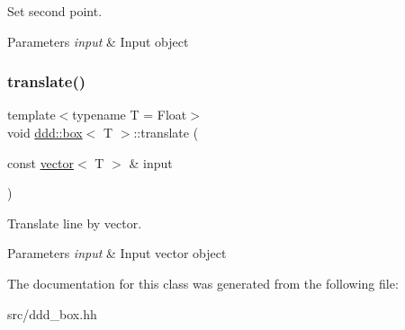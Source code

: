 Set second point. 


\begin{DoxyParams}{Parameters}
{\em input} & Input object \\
\hline
\end{DoxyParams}
\mbox{\label{classddd_1_1box_a6069e4c7bfa545871ff229b4b7e7257f}} 
\subsubsection{\texorpdfstring{translate()}{translate()}}
{\footnotesize\ttfamily template$<$typename T = Float$>$ \\
void \hyperlink{classddd_1_1box}{ddd\+::box}$<$ T $>$\+::translate (\begin{DoxyParamCaption}\item[{const \hyperlink{classddd_1_1vector}{vector}$<$ T $>$ \&}]{input }\end{DoxyParamCaption})\hspace{0.3cm}{\ttfamily [inline]}}



Translate line by vector. 


\begin{DoxyParams}{Parameters}
{\em input} & Input vector object \\
\hline
\end{DoxyParams}


The documentation for this class was generated from the following file\+:\begin{DoxyCompactItemize}
\item 
src/ddd\+\_\+box.\+hh\end{DoxyCompactItemize}
